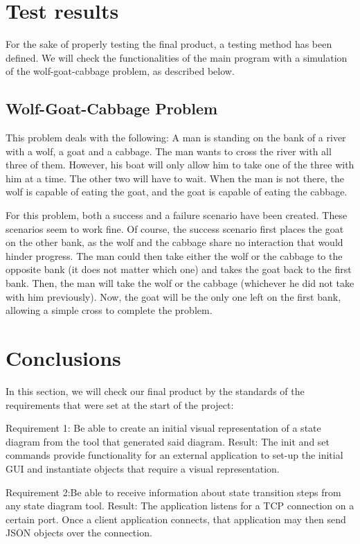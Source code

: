 \documentclass[11pt,a4paper]{article}
\begin{document}
\section{Test results}

For the sake of properly testing the final product, a testing method has been defined. We will check the functionalities of the main program with a simulation of the wolf-goat-cabbage problem, as described below.

\subsection{Wolf-Goat-Cabbage Problem}
This problem deals with the following: A man is standing on the bank of a river with a wolf, a goat and a cabbage. The man wants to cross the river with all three of them. However, his boat will only allow him to take one of the three with him at a time. The other two will have to wait. When the man is not there, the wolf is capable of eating the goat, and the goat is capable of eating the cabbage.

For this problem, both a success and a failure scenario have been created. These scenarios seem to work fine.
Of course, the success scenario first places the goat on the other bank, as the wolf and the cabbage share no interaction that would hinder progress. The man could then take either the wolf or the cabbage to the opposite bank (it does not matter which one) and takes the goat back to the first bank. Then, the man will take the wolf or the cabbage (whichever he did not take with him previously). Now, the goat will be the only one left on the first bank, allowing a simple cross to complete the problem.


\section{Conclusions}

In this section, we will check our final product by the standards of the requirements that were set at the start of the project:

Requirement 1: Be able to create an initial visual representation of a state diagram from the tool that generated said diagram.
Result: The init and set commands provide functionality for an external application to set-up the initial GUI and instantiate objects that require a visual representation.

Requirement 2:Be able to receive information about state transition steps from any state diagram tool.
Result: The application listens for a TCP connection on a certain port. Once a client application connects, that application may then send JSON objects over the connection.
\end{document}
